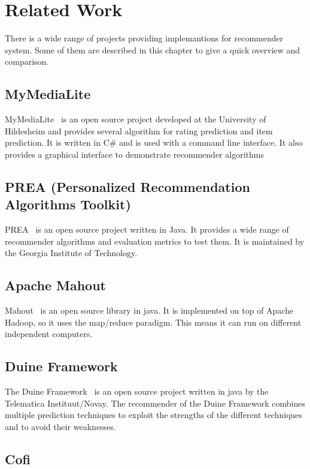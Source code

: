 
\chapter{Related Work}

There is a wide range of projects providing implemantions for recommender
system. Some of them are described in this chapter to give a quick
overview and comparison.


\section{MyMediaLite}

MyMediaLite~\cite{Gantner2011MyMediaLite} is an open source project developed at the
University of Hildesheim and provides several algorithm for rating
prediction and item prediction. It is written in C\# and is used with
a command line interface. It also provides a graphical interface to
demonstrate recommender algorithms


\section{PREA (Personalized Recommendation Algorithms Toolkit)}

PREA~\cite{2012arXiv1205.3193L} is an open source project written in Java. It provides
a wide range of recommender algorithms and evaluation metrics to test
them. It is maintained by the Georgia Institute of Technology.


\section{Apache Mahout}

Mahout~\cite{mahout} is an open source library in java. It is implemented
on top of Apache Hadoop, so it uses the map/reduce paradigm. This
means it can run on different independent computers.


\section{Duine Framework}

The Duine Framework~\cite{duine} is an open source project written
in java by the Telematica Instituut/Novay. The recommender of the
Duine Framework combines multiple prediction techniques to exploit
the strengths of the different techniques and to avoid their weaknesses.


\section{Cofi}


